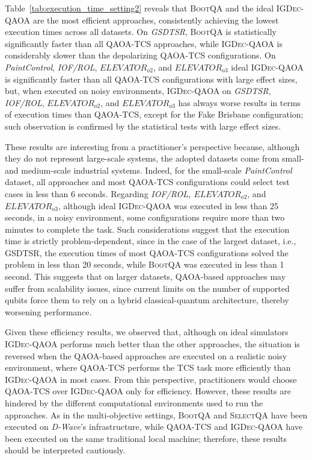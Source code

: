 Table~\ref{tab:execution_time_setting2} reveals that \textsc{BootQA} and the ideal \textsc{IGDec-QAOA} are the most efficient approaches, consistently achieving the lowest execution times across all datasets. On \textit{GSDTSR}, \textsc{BootQA} is statistically significantly faster than all \textsc{QAOA-TCS} approaches, while \textsc{IGDec-QAOA} is considerably slower than the depolarizing \textsc{QAOA-TCS} configurations. On \textit{PaintControl}, \textit{IOF/ROL}, \textit{$ELEVATOR_{o2}$}, and \textit{$ELEVATOR_{o3}$} ideal \textsc{IGDec-QAOA} is significantly faster than all \textsc{QAOA-TCS} configurations with large effect sizes, but, when executed on noisy environments, \textsc{IGDec-QAOA} on \textit{GSDTSR}, \textit{IOF/ROL}, \textit{$ELEVATOR_{o2}$}, and \textit{$ELEVATOR_{o3}$} has always worse results in terms of execution times than \textsc{QAOA-TCS}, except for the Fake Brisbane configuration; such observation is confirmed by the statistical tests with large effect sizes.

These results are interesting from a practitioner's perspective because, although they do not represent large-scale systems, the adopted datasets come from small- and medium-scale industrial systems. Indeed, for the small-scale \textit{PaintControl} dataset, all approaches and most \textsc{QAOA-TCS} configurations could select test cases in less than 6 seconds. Regarding \textit{IOF/ROL, $ELEVATOR_{o2}$}, and \textit{$ELEVATOR_{o3}$}, although ideal \textsc{IGDec-QAOA} was executed in less than 25 seconds, in a noisy environment, some configurations require more than two minutes to complete the task. Such considerations suggest that the execution time is strictly problem-dependent, since in the case of the largest dataset, i.e., \textsc{GSDTSR}, the execution times of most \textsc{QAOA-TCS} configurations solved the problem in less than 20 seconds, while \textsc{BootQA} was executed in less than 1 second. This suggests that on larger datasets, QAOA-based approaches may suffer from scalability issues, since current limits on the number of supported qubits force them to rely on a hybrid classical-quantum architecture, thereby worsening performance.

Given these efficiency results, we observed that, although on ideal simulators \textsc{IGDec-QAOA} performs much better than the other approaches, the situation is reversed when the QAOA-based approaches are executed on a realistic noisy environment, where \textsc{QAOA-TCS} performs the TCS task more efficiently than \textsc{IGDec-QAOA} in most cases. From this perspective, practitioners would choose \textsc{QAOA-TCS} over \textsc{IGDec-QAOA} only for efficiency. However, these results are hindered by the different computational environments used to run the approaches.
As in the multi-objective settings, \textsc{BootQA} and \textsc{SelectQA} have been executed on \textit{D-Wave}'s infrastructure, while \textsc{QAOA-TCS} and \textsc{IGDec-QAOA} have been executed on the same traditional local machine; therefore, these results should be interpreted cautiously.

